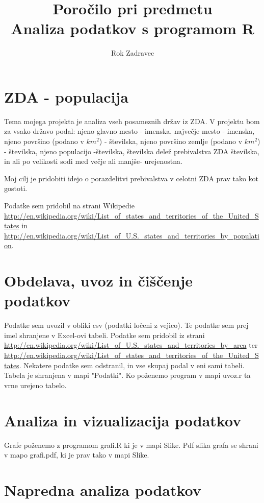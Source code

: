\documentclass[11pt,a4paper]{article}
\begin{document}
\title{Poročilo pri predmetu \\
Analiza podatkov s programom R}
\author{Rok Zadravec}
\maketitle

\section{ZDA - populacija}

Tema mojega projekta je analiza vseh posameznih držav iz ZDA. V projektu bom za vsako državo podal: njeno glavno mesto - imenska, največje mesto - imenska, njeno površino (podano v $km^2$) - številska, njeno površino zemlje (podano v $km^2$) - številska, njeno populacijo -številska, številska delež prebivalstva ZDA številska, in ali po velikosti sodi med večje ali manjše- urejenostna.

Moj cilj je pridobiti idejo o porazdelitvi prebivalstva v celotni ZDA prav tako kot gostoti.

Podatke sem pridobil na strani Wikipedie \url{http://en.wikipedia.org/wiki/List_of_states_and_territories_of_the_United_States} in \url{http://en.wikipedia.org/wiki/List_of_U.S._states_and_territories_by_population}.

\section{Obdelava, uvoz in čiščenje podatkov}

Podatke sem uvozil v obliki csv (podatki ločeni z vejico). Te podatke sem prej imel shranjene v Excel-ovi tabeli. Podatke sem
pridobil iz strani \url{http://en.wikipedia.org/wiki/List_of_U.S._states_and_territories_by_area} ter
\url{http://en.wikipedia.org/wiki/List_of_states_and_territories_of_the_United_States}. Nekatere podatke sem odstranil, in vse skupaj podal v eni sami tabeli. Tabela je shranjena v mapi "Podatki".
Ko poženemo program v mapi uvoz.r ta vrne urejeno tabelo.

\section{Analiza in vizualizacija podatkov}

Grafe poženemo z programom grafi.R ki je v mapi Slike. Pdf slika grafa se shrani v mapo
grafi.pdf,  ki je prav tako v mapi Slike.



\section{Napredna analiza podatkov}




\end{document}
